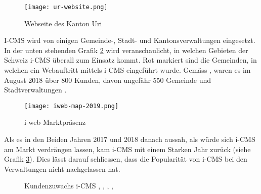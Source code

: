 \begin{figure}[h]
  \centering
  \texttt{[image: ur-website.png]}
  \caption{Webseite des Kanton Uri \parencite{webseiteKantonUri}}
  \label{fig: urweb}
\end{figure}

I-CMS wird von einigen Gemeinde-, Stadt- und Kantonsverwaltungen eingesetzt. In der unten stehenden Grafik \ref{fig: iwebmap2019} wird veranschaulicht, in welchen Gebieten der Schweiz i-CMS überall zum Einsatz kommt. Rot markiert sind die Gemeinden, in welchen ein Webauftritt mittels i-CMS eingeführt wurde. Gemäss \parencite[S. 14]{iweb2018revue}, waren es im August 2018 über 800 Kunden, davon ungefähr 550 Gemeinde und Stadtverwaltungen \parencite{iwebwebsiteGemeindeWeb}.

\begin{figure}[h]
  \centering
  \texttt{[image: iweb-map-2019.png]}
  \caption{i-web Marktpräsenz \parencite[S. 14]{iweb2019revue}}
  \label{fig: iwebmap2019}
\end{figure}

Als es in den Beiden Jahren 2017 und 2018 danach aussah, als würde sich i-CMS am Markt verdrängen lassen, kam i-CMS mit einem Starken Jahr zurück (siehe Grafik \ref{fig:icmszuwachs}). Dies lässt darauf schliessen, dass die Popularität von i-CMS bei den Verwaltungen nicht nachgelassen hat.

\begin{figure}[h]
  \centering
  \caption{Kundenzuwachs i-CMS \parencite[S. 14]{iweb2015revue}, \parencite[S. 14]{iweb2016revue}, \parencite[S. 14]{iweb2017revue}, \parencite[S. 14]{iweb2018revue}, \parencite[S. 14]{iweb2019revue}}
  \label{fig:icmszuwachs}
\end{figure}


